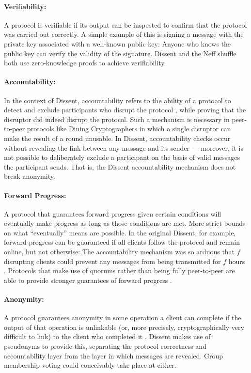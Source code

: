     \paragraph{Verifiability:} A protocol is verifiable if its output can be
    inspected to confirm that the protocol was carried out correctly. A simple
    example of this is signing a message with the private key associated with a
    well-known public key: Anyone who knows the public key can verify the
    validity of the signature. Dissent \cite{corrigan-gibbs_proactively_2013}
    and the Neff shuffle \cite{neff_verifiable_2001} both use zero-knowledge
    proofs to achieve verifiability.
    \paragraph{Accountability:} In the context of Dissent, accountability refers
    to the ability of a protocol to detect and exclude participants who disrupt
    the protocol \cite{syta_security_2014}, while proving that the disruptor did
    indeed disrupt the protocol. Such a mechanism is necessary in peer-to-peer
    protocols like Dining Cryptographers in which a single disruptor can make
    the result of a round unusable. In Dissent, accountability checks occur
    without revealing the link between any message and its sender --- moreover,
    it is not possible to deliberately exclude a participant on the basis of
    valid messages the participant sends. That is, the Dissent accountability
    mechanism does not break anonymity.
    \paragraph{Forward Progress:} A protocol that guarantees forward progress
    given certain conditions will eventually make progress as long as those
    conditions are met. More strict bounds on what ``eventually'' means are
    possible. In the original Dissent, for example, forward progress can be
    guaranteed if all clients follow the protocol and remain online, but not
    otherwise: The accountability mechanism was so arduous that $f$ disrupting
    clients could prevent any messages from being transmitted for $f$ hours
    \cite{corrigan-gibbs_proactively_2013}. Protocols that make use of quorums
    rather than being fully peer-to-peer are able to provide stronger guarantees
    of forward progress \cite{lamport_part-time_1998}.
    \paragraph{Anonymity:} A protocol guarantees anonymity in some operation a
    client can complete if the output of that operation is unlinkable (or, more
    precisely, cryptographically very difficult to link) to the client who
    completed it \cite{corrigan-gibbs_dissent:_2010}. Dissent makes use of
    pseudonyms to provide this, separating the protocol correctness and
    accountability layer from the layer in which messages are revealed. Group
    membership voting could conceivably take place at either.

